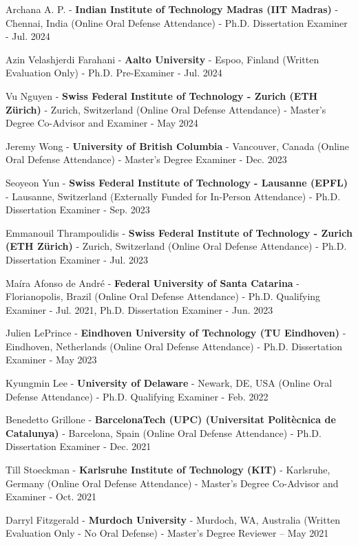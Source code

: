 \documentclass[10pt,a4paper]{article}
\begin{document}
\begin{small}
\begin{etaremune}
\item
Archana A. P. - \textbf{Indian Institute of Technology Madras (IIT Madras)} - Chennai, India (Online Oral Defense Attendance) - Ph.D. Dissertation Examiner - Jul. 2024 
\item
Azin Velashjerdi Farahani - \textbf{Aalto University} - Espoo, Finland (Written Evaluation Only) - Ph.D. Pre-Examiner - Jul. 2024 
\item
Vu Nguyen - \textbf{Swiss Federal Institute of Technology - Zurich (ETH Z\"urich)} - Zurich, Switzerland (Online Oral Defense Attendance) - Master's Degree Co-Advisor and Examiner - May 2024 
\item
Jeremy Wong - \textbf{University of British Columbia} - Vancouver, Canada (Online Oral Defense Attendance) - Master's Degree Examiner - Dec. 2023
\item
Seoyeon Yun - \textbf{Swiss Federal Institute of Technology - Lausanne (EPFL)} - Lausanne, Switzerland (Externally Funded for In-Person Attendance) - Ph.D. Dissertation Examiner - Sep. 2023 
\item
Emmanouil Thrampoulidis - \textbf{Swiss Federal Institute of Technology - Zurich (ETH Z\"urich)} - Zurich, Switzerland (Online Oral Defense Attendance) - Ph.D. Dissertation Examiner - Jul. 2023 
\item
Maíra Afonso de André - \textbf{Federal University of Santa Catarina} - Florianopolis, Brazil (Online Oral Defense Attendance) - Ph.D. Qualifying Examiner - Jul. 2021, Ph.D. Dissertation Examiner - Jun. 2023
\item
Julien LePrince - \textbf{Eindhoven University of Technology (TU Eindhoven)} - Eindhoven, Netherlands (Online Oral Defense Attendance) - Ph.D. Dissertation Examiner - May 2023 
\item
Kyungmin Lee - \textbf{University of Delaware} - Newark, DE, USA (Online Oral Defense Attendance) - Ph.D. Qualifying Examiner - Feb. 2022 
\item
Benedetto Grillone - \textbf{BarcelonaTech (UPC) (Universitat Politècnica de Catalunya)} - Barcelona, Spain (Online Oral Defense Attendance) - Ph.D. Dissertation Examiner - Dec. 2021
\item
Till Stoeckman - \textbf{Karlsruhe Institute of Technology (KIT)} - Karlsruhe, Germany (Online Oral Defense Attendance) - Master's Degree Co-Advisor and Examiner - Oct. 2021
\item
Darryl Fitzgerald - \textbf{Murdoch University} - Murdoch, WA, Australia (Written Evaluation Only - No Oral Defense) - Master’s Degree Reviewer – May 2021

\end{etaremune}
\end{small}
\end{document}
